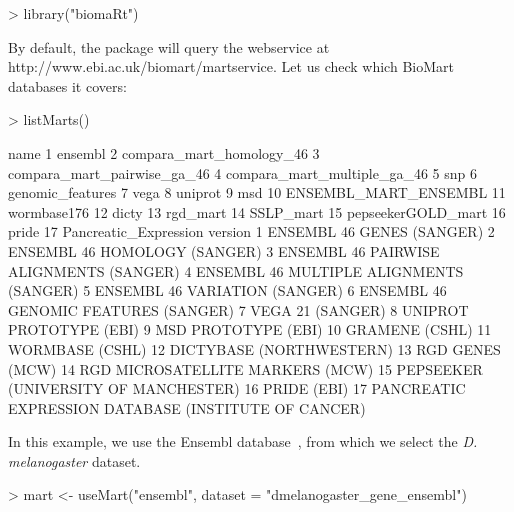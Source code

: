 \begin{Schunk}
\begin{Sinput}
> library("biomaRt")
\end{Sinput}
\end{Schunk}
%
By default, the  package will query the webservice at\newline 
http://www.ebi.ac.uk/biomart/martservice.  Let us check
which BioMart databases it covers:
%
\begin{Schunk}
\begin{Sinput}
> listMarts()
\end{Sinput}
\begin{Soutput}
                          name
1                      ensembl
2     compara_mart_homology_46
3  compara_mart_pairwise_ga_46
4  compara_mart_multiple_ga_46
5                          snp
6             genomic_features
7                         vega
8                      uniprot
9                          msd
10        ENSEMBL_MART_ENSEMBL
11                 wormbase176
12                       dicty
13                    rgd_mart
14                   SSLP_mart
15          pepseekerGOLD_mart
16                       pride
17       Pancreatic_Expression
                                                version
1                             ENSEMBL 46 GENES (SANGER)
2                          ENSEMBL 46 HOMOLOGY (SANGER)
3               ENSEMBL 46 PAIRWISE ALIGNMENTS (SANGER)
4               ENSEMBL 46 MULTIPLE ALIGNMENTS (SANGER)
5                        ENSEMBL 46 VARIATION  (SANGER)
6                  ENSEMBL 46 GENOMIC FEATURES (SANGER)
7                                     VEGA 21  (SANGER)
8                               UNIPROT PROTOTYPE (EBI)
9                                   MSD PROTOTYPE (EBI)
10                                       GRAMENE (CSHL)
11                                      WORMBASE (CSHL)
12                             DICTYBASE (NORTHWESTERN)
13                                      RGD GENES (MCW)
14                     RGD MICROSATELLITE MARKERS (MCW)
15                 PEPSEEKER (UNIVERSITY OF MANCHESTER)
16                                          PRIDE (EBI)
17 PANCREATIC EXPRESSION DATABASE (INSTITUTE OF CANCER)
\end{Soutput}
\end{Schunk}
%
In this example, we use the Ensembl database~\cite{Ensembl2006}, from
which we select the \textit{D. melanogaster} dataset.
%
\begin{Schunk}
\begin{Sinput}
> mart <- useMart("ensembl", dataset = "dmelanogaster_gene_ensembl")
\end{Sinput}
\end{Schunk}
